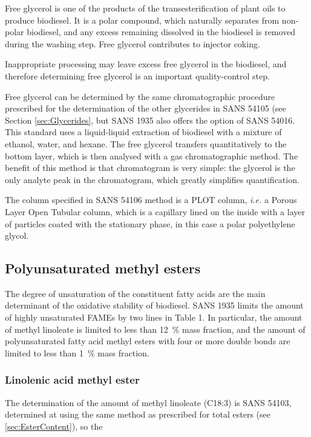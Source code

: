 Free glycerol is one of the products of the transesterification of plant oils to
produce biodiesel. It is a polar compound, which naturally separates from
non-polar biodiesel, and any excess remaining dissolved in the biodiesel is
removed during the washing step. Free glycerol contributes to injector coking. 

Inappropriate processing may leave excess free glycerol in the biodiesel, and
therefore determining free glycerol is an important quality-control step.

Free glycerol can be determined by the same chromatographic procedure prescribed
for the determination of the other glycerides in SANS 54105 (see Section
\ref{sec:Glycerides}, but SANS 1935 also offers the option of SANS 54016. This
standard uses a liquid-liquid extraction of biodiesel with a mixture of ethanol,
water, and hexane. The free glycerol transfers quantitatively to the bottom
layer, which is then analysed with a gas chromatographic method. The benefit of
this method is that chromatogram is very simple: the glycerol is the only
analyte peak in the chromatogram, which greatly simplifies quantification.

The column specified in SANS 54106 method is a PLOT column, \textit{i.e.} a
Porous Layer Open Tubular column, which is a capillary lined on the inside with
a layer of particles coated with the stationary phase, in this case a polar
polyethylene glycol. 

\subsection{Polyunsaturated methyl esters}
\label{sec:ChromDetUnsat}

The degree of unsaturation of the constituent fatty acids are the main
determinant of the oxidative stability of biodiesel. SANS 1935 limits the amount
of highly unsaturated FAMEs by two lines in Table 1. In particular, the amount
of methyl linoleate is limited to less than \SI{12}{\percent} mass fraction, and
the amount of polyunsaturated fatty acid methyl esters with four or more double
bonds are limited to less than \SI{1}{\percent} mass fraction.

\subsubsection{Linolenic acid methyl ester}

The determination of the amount of methyl linoleate (C18:3) is SANS 54103, determined
at using the same method as prescribed for total esters (see \ref{sec:EsterContent}), so the 

